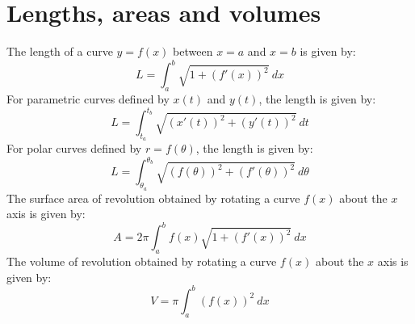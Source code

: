 \documentclass{scrartcl}
\begin{document}
\section{Lengths, areas and volumes}
The length of a curve $ y = f(x) $ between $ x = a $ and $ x = b $ is given by:
\begin{equation}
L = \int_{a}^{b} \sqrt{1+(f'(x))^{2}} \ dx
\end{equation}
For parametric curves defined by $ x(t) $ and $ y(t) $, the length is given by:
\begin{equation}
L = \int_{t_{a}}^{t_{b}} \sqrt{(x'(t))^{2}+(y'(t))^{2}} \ dt
\end{equation}
For polar curves defined by $ r = f(\theta) $, the length is given by:
\begin{equation}
L = \int_{\theta_{a}}^{\theta_{b}} \sqrt{(f(\theta))^{2}+(f'(\theta))^{2}} \ d \theta
\end{equation}
The surface area of revolution obtained by rotating a curve $ f(x) $ about the $ x $ axis is given by:
\begin{equation}
A = 2 \pi \int_{a}^{b} f(x) \sqrt{1+(f'(x))^{2}} \ dx
\end{equation}
The volume of revolution obtained by rotating a curve $ f(x) $ about the $ x $ axis is given by:
\begin{equation}
V = \pi \int_{a}^{b} (f(x))^{2} \ dx
\end{equation}
\end{document}
